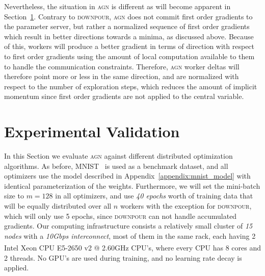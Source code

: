 Nevertheless, the situation in \textsc{agn} is different as will become apparent in Section~\ref{sec:agn_experimental_validation}. Contrary to \textsc{downpour}, \textsc{agn} does not commit first order gradients to the parameter server, but rather a normalized sequence of first order gradients which result in better directions towards a minima, as discussed above. Because of this, workers will produce a better gradient in terms of direction with respect to first order gradients using the amount of local computation available to them to handle the communication constraints. Therefore, \textsc{agn} worker deltas will therefore point more or less in the same direction, and are normalized with respect to the number of exploration steps, which reduces the amount of implicit momentum since first order gradients are not applied to the central variable.

\section{Experimental Validation}
\label{sec:agn_experimental_validation}

In this Section we evaluate \textsc{agn} against different distributed optimization algorithms. As before, MNIST~\cite{mnist} is used as a benchmark dataset, and all optimizers use the model described in Appendix~\ref{appendix:mnist_model} with identical parameterization of the weights. Furthermore, we will set the mini-batch size to $m = 128$ in all optimizers, and use \emph{40 epochs} worth of training data that will be equally distributed over all $n$ workers with the exception for \textsc{downpour}, which will only use 5 epochs, since \textsc{downpour} can not handle accumulated gradients. Our computing infrastructure consists a relatively small cluster of \emph{15 nodes} with a \emph{10Gbps interconnect}, most of them in the same rack, each having 2 Intel\textsuperscript{\textregistered} Xeon\textsuperscript{\textregistered} CPU E5-2650 v2 @ 2.60GHz CPU's, where every CPU has 8 cores and 2 threads. No GPU's are used during training, and no learning rate decay is applied.\\

